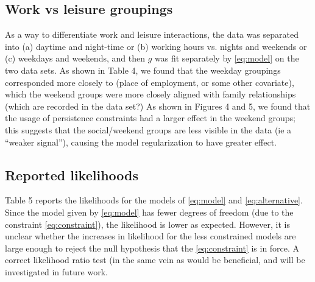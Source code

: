\documentclass{article}
\begin{document}
\subsection{Work vs leisure groupings}
As a way to differentiate work and leisure interactions, the data was separated into (a) daytime and night-time or (b) working hours vs. nights and weekends or (c) weekdays and weekends, and then $g$ was fit separately by \eqref{eq:model} on the two data sets. As shown in Table 4, we found that the weekday groupings corresponded more closely to (place of employment, or some other covariate), which the weekend groups were more closely aligned with family relationships (which are recorded in the data set?) As shown in Figures 4 and 5, we found that the usage of persistence constraints had a larger effect in the weekend groups; this suggests that the social/weekend groups are less visible in the data (ie a ``weaker signal''), causing the model regularization to have greater effect.

\subsection{Reported likelihoods}

Table 5 reports the likelihoods for the models of \eqref{eq:model} and \eqref{eq:alternative}. Since the model given by \eqref{eq:model} has fewer degrees of freedom (due to the constraint \eqref{eq:constraint}), the likelihood is lower as expected. However, it is unclear whether the increases in likelihood for the less constrained models are large enough to reject the null hypothesis that the \eqref{eq:constraint} is in force. A correct likelihood ratio test (in the same vein as \cite{yan2012model} would be beneficial, and will be investigated in future work.




\end{document}
